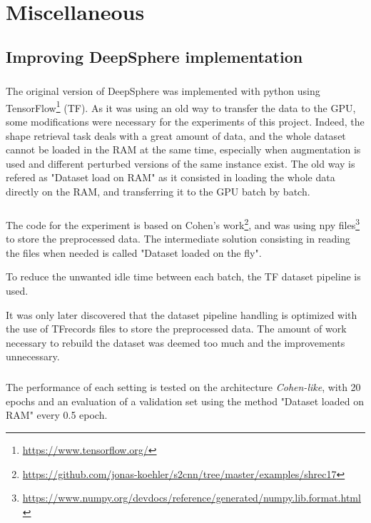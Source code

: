 \documentclass[11pt]{report}
\begin{document}
\printbibliography
{}
\cleardoublepage
\mbox{~}
\cleardoublepage
\appendix
\chapter{Miscellaneous}
\section*{Improving DeepSphere implementation}
\paragraph*{}
The original version of DeepSphere was implemented with python using TensorFlow\footnote{\url{https://www.tensorflow.org/}} (TF). As it was using an old way to transfer the data to the GPU, some modifications were necessary for the experiments of this project. Indeed, the shape retrieval task deals with a great amount of data, and the whole dataset cannot be loaded in the RAM at the same time, especially when augmentation is used and different perturbed versions of the same instance exist.
The old way is refered as "Dataset load on RAM" as it consisted in loading the whole data directly on the RAM, and transferring it to the GPU batch by batch.

\paragraph*{}
The code for the experiment is based on Cohen's work\footnote{\url{https://github.com/jonas-koehler/s2cnn/tree/master/examples/shrec17}}, and was using npy files\footnote{\url{https://www.numpy.org/devdocs/reference/generated/numpy.lib.format.html}} to store the preprocessed data. The intermediate solution consisting in reading the files when needed is called "Dataset loaded on the fly".

To reduce the unwanted idle time between each batch, the TF dataset pipeline is used. 

It was only later discovered that the dataset pipeline handling is optimized with the use of TFrecords files to store the preprocessed data. The amount of work necessary to rebuild the dataset was deemed too much and the improvements unnecessary.

\paragraph*{}
The performance of each setting is tested on the architecture \emph{Cohen-like}, with 20 epochs and an evaluation of a validation set using the method "Dataset loaded on RAM" every 0.5 epoch.
\end{document}
